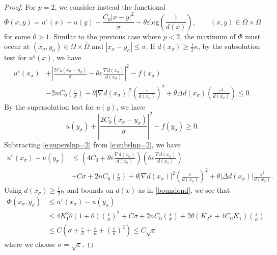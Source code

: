 \documentclass[11pt,reqno]{amsart}
\numberwithin{figure}{section}
\theoremstyle{plain}
\theoremstyle{remark}
\numberwithin{equation}{section}
\begin{document}
\begin{proof}
\noindent For $p=2$, we consider instead the functional 
\begin{equation*}
    \Phi(x,y) = u^\varepsilon(x) - u(y) - \frac{C_0|x-y|^2}{\sigma} - \theta \varepsilon \mathrm{log}\left(\frac{1}{d(x)}\right), \qquad (x,y)\in \overline{\Omega}\times \overline{\Omega}
\end{equation*}
for some $\theta>1$. Similar to the previous case where $p<2$, the maximum of $\Phi$ must occur at $(x_\sigma,y_\sigma)\in \Omega\times\overline{\Omega}$ and $|x_\sigma - y_\sigma|\leq \sigma$. If $d(x_\sigma)\geq \frac{1}{2}\kappa$, by the subsolution test for $u^\varepsilon(x)$, we have
\begin{align}\label{e:subslnp=2}
    u^\varepsilon(x_\sigma)&+ \left|\frac{2C_0(x_\sigma - y_\sigma)}{\sigma} - \theta \varepsilon \frac{\nabla d(x_\sigma)}{d(x_\sigma)}\right|^2  -f(x_\sigma) \nonumber\\
    &- 2nC_0\left(\frac{\varepsilon}{\sigma}\right) - \theta |\nabla d(x_\sigma)|^2 \left(\frac{\varepsilon}{d(x_\sigma)}\right)^2  + \theta \Delta d(x_\sigma)\left(\frac{\varepsilon^2}{d(x_\sigma)}\right) \leq 0.
\end{align}
By the supersolution test for $u(y)$, we have
\begin{equation}\label{e:superslnp=2}
    u(y_\sigma) + \left|\frac{2C_0(x_\sigma - y_\sigma)}{\sigma}\right|^2 - f(y_\sigma) \geq 0.
\end{equation}
Subtracting \eqref{e:superslnp=2} from \eqref{e:subslnp=2}, we have
\begin{align*}
    u^\varepsilon(x_\sigma) - u(y_\sigma) &\leq \left(4C_0+ \theta\varepsilon\frac{\nabla d(x_\sigma)}{d(x_\sigma)}\right)\left(\theta \varepsilon \frac{ \nabla d(x_\sigma)}{d(x_\sigma)}\right) \\
    &+ C\sigma + 2nC_0 \left(\frac{\varepsilon}{\sigma}\right)+ \theta |\nabla d(x_\sigma)|^2 \left(\frac{\varepsilon}{d(x_\sigma)}\right)^2 + \theta|\Delta d(x_\sigma)| \frac{\varepsilon^2}{d(x_\sigma)}.
\end{align*}
Using $d(x_\sigma)\geq \frac{1}{2}\kappa$ and bounds on $d(x)$ as in \eqref{boundond}, we see that
\begin{align}\label{p=2a}
    \Phi(x_\sigma,y_\sigma)&\leq u^\varepsilon(x_\sigma) - u(y_\sigma)\nonumber \\
    &\leq 4K_1^2\theta(1+\theta)\left(\frac{\varepsilon}{\kappa}\right)^2 + C\sigma + 2nC_0\left( \frac{\varepsilon}{\sigma}\right) + 2\theta(K_2\varepsilon+4C_0K_1)\left(\frac{\varepsilon}{\kappa}\right)\nonumber\\
    &\leq C\left(\sigma+\frac{\varepsilon}{\sigma} + \frac{\varepsilon}{\kappa} + \left(\frac{\varepsilon}{\kappa}\right)^2\right) \leq C\sqrt{\varepsilon}
\end{align}
where we choose $\sigma = \sqrt{\varepsilon}$. 


\end{proof}
\end{document}
